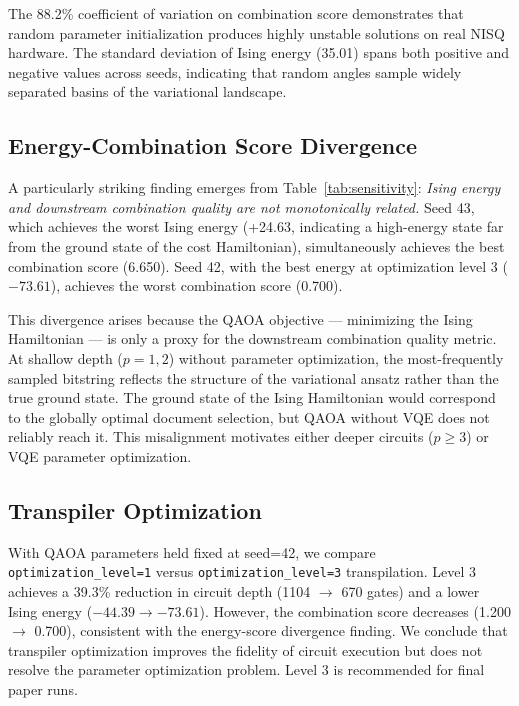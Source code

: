 \documentclass{article}
\begin{document}
The 88.2\% coefficient of variation on combination score demonstrates
that random parameter initialization produces highly unstable solutions
on real NISQ hardware. The standard deviation of Ising energy (35.01)
spans both positive and negative values across seeds, indicating that
random angles sample widely separated basins of the variational
landscape.

\subsection{Energy-Combination Score Divergence}

A particularly striking finding emerges from Table~\ref{tab:sensitivity}:
\emph{Ising energy and downstream combination quality are not
monotonically related.} Seed 43, which achieves the worst Ising energy
(+24.63, indicating a high-energy state far from the ground state of
the cost Hamiltonian), simultaneously achieves the best combination
score (6.650). Seed 42, with the best energy at optimization level 3
($-73.61$), achieves the worst combination score (0.700).

This divergence arises because the QAOA objective — minimizing the
Ising Hamiltonian — is only a proxy for the downstream combination
quality metric. At shallow depth ($p=1,2$) without parameter
optimization, the most-frequently sampled bitstring reflects the
structure of the variational ansatz rather than the true ground state.
The ground state of the Ising Hamiltonian would correspond to the
globally optimal document selection, but QAOA without VQE does not
reliably reach it. This misalignment motivates either deeper circuits
($p \geq 3$) or VQE parameter optimization.

\subsection{Transpiler Optimization}

With QAOA parameters held fixed at seed=42, we compare
\texttt{optimization\_level=1} versus \texttt{optimization\_level=3}
transpilation. Level 3 achieves a 39.3\% reduction in circuit depth
(1104 $\to$ 670 gates) and a lower Ising energy ($-44.39 \to -73.61$).
However, the combination score decreases (1.200 $\to$ 0.700),
consistent with the energy-score divergence finding. We conclude that
transpiler optimization improves the fidelity of circuit execution but
does not resolve the parameter optimization problem. Level 3 is
recommended for final paper runs.
\end{document}
